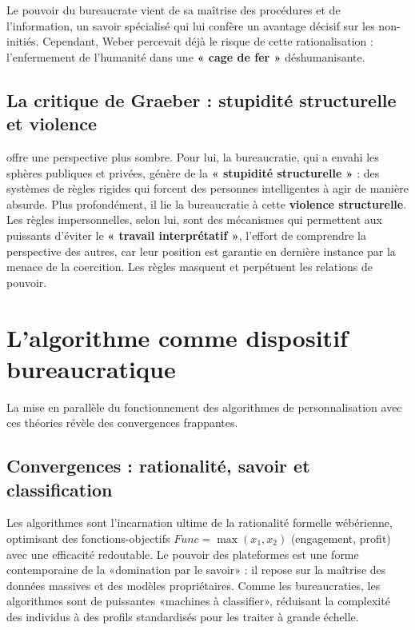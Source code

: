 Le pouvoir du bureaucrate vient de sa maîtrise des procédures et de l'information, un savoir spécialisé qui lui confère un avantage décisif sur les non-initiés. Cependant, Weber percevait déjà le risque de cette rationalisation : l'enfermement de l'humanité dans une \textbf{« cage de fer »} déshumanisante.

\subsection{La critique de Graeber : stupidité structurelle et violence}
\citet{Graeber2015} offre une perspective plus sombre. Pour lui, la bureaucratie, qui a envahi les sphères publiques et privées, génère de la \textbf{« stupidité structurelle »} : des systèmes de règles rigides qui forcent des personnes intelligentes à agir de manière absurde. Plus profondément, il lie la bureaucratie à cette \textbf{violence structurelle}. Les règles impersonnelles, selon lui, sont des mécanismes qui permettent aux puissants d'éviter le \textbf{« travail interprétatif »}, l'effort de comprendre la perspective des autres, car leur position est garantie en dernière instance par la menace de la coercition. Les règles masquent et perpétuent les relations de pouvoir.

\section{L'algorithme comme dispositif bureaucratique}
La mise en parallèle du fonctionnement des algorithmes de personnalisation avec ces théories révèle des convergences frappantes.

\subsection{Convergences : rationalité, savoir et classification}
Les algorithmes sont l'incarnation ultime de la rationalité formelle wébérienne, optimisant des fonctions-objectifs $Func = \max(x_1, x_2)$  (engagement, profit) avec une efficacité redoutable. Le pouvoir des plateformes est une forme contemporaine de la «domination par le savoir» : il repose sur la maîtrise des données massives et des modèles propriétaires. Comme les bureaucraties, les algorithmes sont de puissantes «machines à classifier», réduisant la complexité des individus à des profils standardisés pour les traiter à grande échelle.

